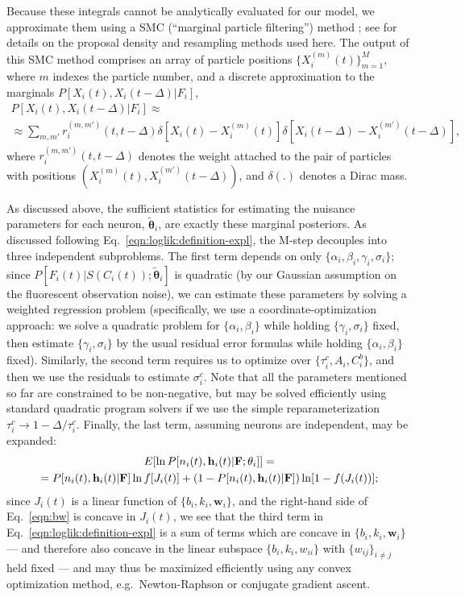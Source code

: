 \documentclass[aoas,preprint]{imsart}
\newcommand{\bth}{\mathbf{\theta}}
\newcommand{\w}{w}
\newcommand{\bw}{\mathbf{\w}}
\newcommand{\bF}{{\bf F}}
\newcommand{\bh}{\mathbf{h}}
\newcommand{\tbth}{\tilde{\bth}}
\begin{document}
Because these integrals cannot be analytically evaluated for our model, we approximate them using a SMC (``marginal particle filtering'') method \cite{DGA00,DFG01,GDW04}; see \cite{Vogelstein2009} for details on the proposal density and resampling methods used here. The output of this SMC method comprises an array of particle positions $\{X_i^{(m)}(t)\}_{m=1}^{M}$, where $m$ indexes the particle number, and a discrete approximation to the marginals $P[X_i(t), X_i(t-\Delta) | F_i]$,
\begin{multline}
P[X_i(t), X_i(t-\Delta) | F_i] \approx \\
\approx \sum_{m,m'}
r_i^{(m,m')}(t,t-\Delta) \delta \left[ X_i(t) - X_i^{(m)}(t) \right]
\delta \left[ X_i(t-\Delta) - X_i^{(m')}(t-\Delta) \right],
\label{eqn:particle-fb}
\end{multline}
where $r_i^{(m,m')}(t,t-\Delta)$ denotes the weight attached to the
pair of particles with positions $\left( X_i^{(m)}(t),
X_i^{(m')}(t-\Delta) \right)$, and $\delta(.)$ denotes a Dirac mass.

As discussed above, the sufficient statistics for estimating the nuisance parameters for each neuron, $\tbth_i$, are exactly these marginal posteriors. As discussed following Eq.~\eqref{eqn:loglik:definition-expl}, the M-step decouples into three independent subproblems. The first term depends on only $\{\alpha_i, \beta_i, \gamma_i, \sigma_i\}$; since $P[F_i(t)|S(C_i(t)); \tbth_i]$ is quadratic (by our Gaussian assumption on the fluorescent observation noise), we can estimate these parameters by solving a weighted regression problem (specifically, we use a coordinate-optimization approach: we solve a quadratic problem for $\{\alpha_i, \beta_i\}$ while holding $\{\gamma_i, \sigma_i\}$ fixed, then estimate $\{\gamma_i,\sigma_i\}$ by the usual residual error formulas while holding $\{\alpha_i, \beta_i\}$ fixed). Similarly, the second term requires us to optimize over $\{\tau_i^c, A_i, C_i^b\}$, and then we use the residuals to estimate $\sigma_i^c$. Note that all the parameters mentioned so far are constrained to be non-negative, but may be solved efficiently using standard quadratic program solvers if we use the simple reparameterization $\tau_i^c \to 1- \Delta / \tau_i^c$. Finally, the last term, assuming neurons are independent, may be expanded:
\begin{multline}
E [\ln P[n_i(t), \bh_i(t) | \bF; \bth_i]] =  \\ = P[n_i(t), \bh_i(t) |
\bF] \ln f [J_i(t)] + (1-P[n_i(t), \bh_i(t) | \bF]) \ln [1-
f(J_i(t))];
\label{eqn:bw}
\end{multline}
since $J_i(t)$ is a linear function of $\{b_i,k_i,\bw_i\}$, and the right-hand side of Eq.~\eqref{eqn:bw} is concave in $J_i(t)$, we see that the third term in Eq.~\eqref{eqn:loglik:definition-expl} is a sum of terms which are concave in $\{b_i,k_i,\bw_i\}$ --- and therefore also concave in the linear subspace $\{b_i,k_i, w_{ii}\}$ with $\{w_{ij}\}_{i \neq j}$ held fixed --- and may thus be maximized efficiently using any convex optimization method, e.g.\ Newton-Raphson or conjugate gradient ascent.
\end{document}
